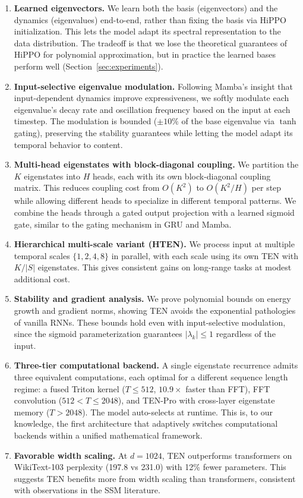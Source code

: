 \documentclass{article}
\begin{document}
\begin{enumerate}
\item \textbf{Learned eigenvectors.} We learn both the basis (eigenvectors) and the dynamics (eigenvalues) end-to-end, rather than fixing the basis via HiPPO initialization. This lets the model adapt its spectral representation to the data distribution. The tradeoff is that we lose the theoretical guarantees of HiPPO for polynomial approximation, but in practice the learned bases perform well (Section~\ref{sec:experiments}).

\item \textbf{Input-selective eigenvalue modulation.} Following Mamba's insight that input-dependent dynamics improve expressiveness, we softly modulate each eigenvalue's decay rate and oscillation frequency based on the input at each timestep. The modulation is bounded ($\pm 10\%$ of the base eigenvalue via $\tanh$ gating), preserving the stability guarantees while letting the model adapt its temporal behavior to content.

\item \textbf{Multi-head eigenstates with block-diagonal coupling.} We partition the $K$ eigenstates into $H$ heads, each with its own block-diagonal coupling matrix. This reduces coupling cost from $O(K^2)$ to $O(K^2/H)$ per step while allowing different heads to specialize in different temporal patterns. We combine the heads through a gated output projection with a learned sigmoid gate, similar to the gating mechanism in GRU and Mamba.

\item \textbf{Hierarchical multi-scale variant (HTEN).} We process input at multiple temporal scales $\{1, 2, 4, 8\}$ in parallel, with each scale using its own TEN with $K/|S|$ eigenstates. This gives consistent gains on long-range tasks at modest additional cost.

\item \textbf{Stability and gradient analysis.} We prove polynomial bounds on energy growth and gradient norms, showing TEN avoids the exponential pathologies of vanilla RNNs. These bounds hold even with input-selective modulation, since the sigmoid parameterization guarantees $|\lambda_k| \leq 1$ regardless of the input.

\item \textbf{Three-tier computational backend.} A single eigenstate recurrence admits three equivalent computations, each optimal for a different sequence length regime: a fused Triton kernel ($T \leq 512$, $10.9\times$ faster than FFT), FFT convolution ($512 < T \leq 2048$), and TEN-Pro with cross-layer eigenstate memory ($T > 2048$). The model auto-selects at runtime. This is, to our knowledge, the first architecture that adaptively switches computational backends within a unified mathematical framework.

\item \textbf{Favorable width scaling.} At $d = 1024$, TEN outperforms transformers on WikiText-103 perplexity (197.8 vs 231.0) with 12\% fewer parameters. This suggests TEN benefits more from width scaling than transformers, consistent with observations in the SSM literature.
\end{enumerate}
\end{document}
